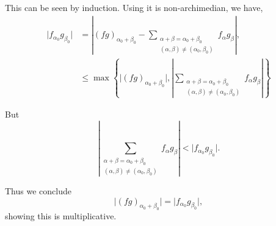 \documentclass[10pt]{article}
\begin{document}
This can be seen by induction. Using it is non-archimedian, we have,
\begin{align*}
  \vert f_{\alpha_0}g_{\beta_0}\vert&=\left\vert (fg)_{\alpha_0+\beta_0}-\sum_{\substack{\alpha+\beta=\alpha_0+\beta_0\\(\alpha,\beta)\not=(\alpha_0,\beta_0)}}f_\alpha g_\beta\right\vert,\\
  &\leq \max\left\{\vert (fg)_{\alpha_0+\beta_0}\vert,\left\vert\sum_{\substack{\alpha+\beta=\alpha_0+\beta_0\\(\alpha,\beta)\not=(\alpha_0,\beta_0)}}f_\alpha g_\beta\right\vert \right\}
\end{align*}

But 
\begin{equation*}
    \left\vert\sum_{\substack{\alpha+\beta=\alpha_0+\beta_0\\(\alpha,\beta)\not=(\alpha_0,\beta_0)}}f_\alpha g_\beta\right\vert <\vert f_{\alpha_0}g_{\beta_0}\vert.
\end{equation*}

Thus we conclude
\begin{equation*}
  \vert (fg)_{\alpha_0+\beta_0}\vert = \vert f_{\alpha_0}g_{\beta_0}\vert,
\end{equation*}
showing this is multiplicative.
\end{document}
